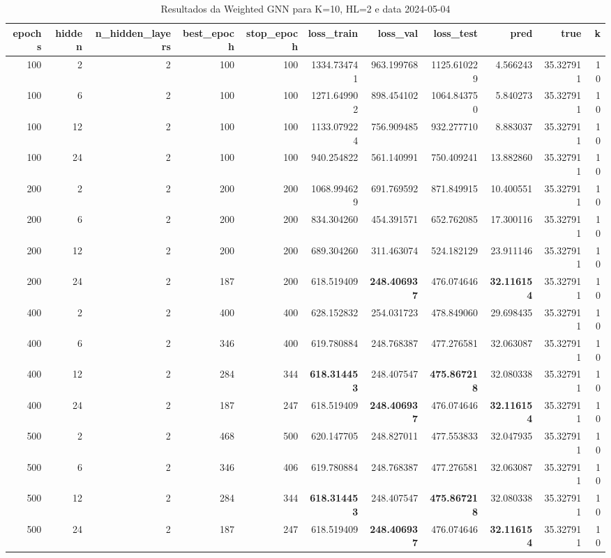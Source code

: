 \begin{table}
\caption{Resultados da Weighted GNN para K=10, HL=2 e data 2024-05-04}
\label{tab:weighted_gnn_results_k10_hl2_d20240504}
\begin{tabular}{rrrrrrrrrrr}
\toprule
epochs & hidden & n\_hidden\_layers & best\_epoch & stop\_epoch & loss\_train & loss\_val & loss\_test & pred & true & k \\
\midrule
100 & 2 & 2 & 100 & 100 & 1334.734741 & 963.199768 & 1125.610229 & 4.566243 & 35.327911 & 10 \\
100 & 6 & 2 & 100 & 100 & 1271.649902 & 898.454102 & 1064.843750 & 5.840273 & 35.327911 & 10 \\
100 & 12 & 2 & 100 & 100 & 1133.079224 & 756.909485 & 932.277710 & 8.883037 & 35.327911 & 10 \\
100 & 24 & 2 & 100 & 100 & 940.254822 & 561.140991 & 750.409241 & 13.882860 & 35.327911 & 10 \\
200 & 2 & 2 & 200 & 200 & 1068.994629 & 691.769592 & 871.849915 & 10.400551 & 35.327911 & 10 \\
200 & 6 & 2 & 200 & 200 & 834.304260 & 454.391571 & 652.762085 & 17.300116 & 35.327911 & 10 \\
200 & 12 & 2 & 200 & 200 & 689.304260 & 311.463074 & 524.182129 & 23.911146 & 35.327911 & 10 \\
200 & 24 & 2 & 187 & 200 & 618.519409 & \textbf{248.406937} & 476.074646 & \textbf{32.116154} & 35.327911 & 10 \\
400 & 2 & 2 & 400 & 400 & 628.152832 & 254.031723 & 478.849060 & 29.698435 & 35.327911 & 10 \\
400 & 6 & 2 & 346 & 400 & 619.780884 & 248.768387 & 477.276581 & 32.063087 & 35.327911 & 10 \\
400 & 12 & 2 & 284 & 344 & \textbf{618.314453} & 248.407547 & \textbf{475.867218} & 32.080338 & 35.327911 & 10 \\
400 & 24 & 2 & 187 & 247 & 618.519409 & \textbf{248.406937} & 476.074646 & \textbf{32.116154} & 35.327911 & 10 \\
500 & 2 & 2 & 468 & 500 & 620.147705 & 248.827011 & 477.553833 & 32.047935 & 35.327911 & 10 \\
500 & 6 & 2 & 346 & 406 & 619.780884 & 248.768387 & 477.276581 & 32.063087 & 35.327911 & 10 \\
500 & 12 & 2 & 284 & 344 & \textbf{618.314453} & 248.407547 & \textbf{475.867218} & 32.080338 & 35.327911 & 10 \\
500 & 24 & 2 & 187 & 247 & 618.519409 & \textbf{248.406937} & 476.074646 & \textbf{32.116154} & 35.327911 & 10 \\

\end{tabular}
\end{table}

